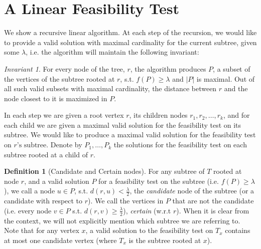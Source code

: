 \documentclass[11pt,a4paper]{article}
\theoremstyle{definition}
\newtheorem{definition}{Definition}
\theoremstyle{remark}
\newtheorem{invariant}{Invariant}
\begin{document}
\section{A Linear Feasibility Test}\label{linear F.T.}
We show a recursive linear algorithm. At each step of the recursion, we would like to provide a valid solution with maximal cardinality for the current subtree, given some $\lambda$, i.e. the algorithm will maintain the following invariant:
\begin{invariant}\label{Maximality of P and distance of closest node invariant}
For every node of the tree, $r$, the algorithm produces $P$, a subset of the vertices of the subtree rooted at $r$, s.t. $f(P)\geq\lambda$ and $|P|$ is maximal. Out of all such valid subsets with maximal cardinality, the distance between $r$ and the node closest to it is maximized in $P$.
\end{invariant}
In each step we are given a root vertex $r$, its children nodes $r_{1},r_{2},\ldots,r_{k}$, and for each child we are given a maximal valid solution for the feasibility test on its subtree. We would like to produce a maximal valid solution for the feasibility test on $r\text{'s subtree}$.
Denote by $P_{1},\ldots,P_{k}$ the solutions for the feasibility test on each subtree rooted at a child of $r$.
\begin{definition}[Candidate and Certain nodes]
For any subtree of $T$ rooted at node $r$, and a valid solution $P$ for a feasibility test on the subtree (i.e. $f(P)\geq\lambda$), we call a node $u\in P$, s.t. $d(r,u)<\frac{\lambda}{2}$, the \emph{candidate} node of the subtree (or a candidate with respect to $r$). We call the vertices in $P$ that are not the candidate (i.e. every node $v \in P$ s.t. $d(r,v)\geq \frac{\lambda}{2}$), \emph{certain} (w.r.t $r$). When it is clear from the context, we will not explicitly mention which subtree we are referring to.
Note that for any vertex $x$, a valid solution to the feasibility test on $T_x$ contains at most one candidate vertex (where $T_x$ is the subtree rooted at $x$).
\end{definition}
\end{document}
